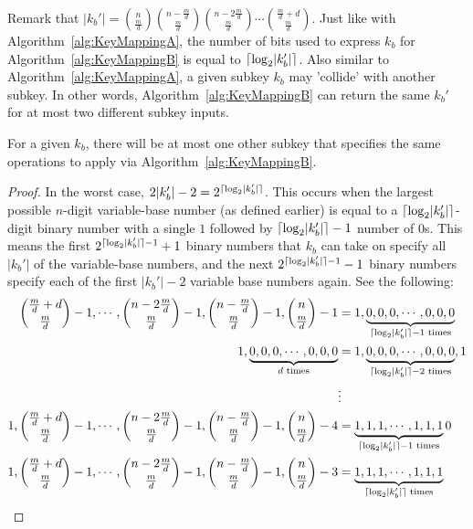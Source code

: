 Remark that $\lvert k_b' \rvert = {n \choose \frac{m}{d}}{n - \frac{m}{d} \choose \frac{m}{d}}{n - 2\frac{m}{d} \choose \frac{m}{d}}\cdots{\frac{m}{d} + d \choose \frac{m}{d}}$. Just like with Algorithm~\ref{alg:KeyMappingA}, the number of bits used to express $k_b$ for Algorithm~\ref{alg:KeyMappingB} is equal to $\lceil\log_2 \lvert k_b' \rvert\rceil$. Also similar to Algorithm~\ref{alg:KeyMappingA}, a given subkey $k_b$ may 'collide' with another subkey. In other words, Algorithm~\ref{alg:KeyMappingB} can return the same $k_b'$ for at most two different subkey inputs.
\begin{theorem}
\label{theorem:collisionForMappingB}
For a given $k_b$, there will be at most one other subkey that specifies the same operations to apply via Algorithm~\ref{alg:KeyMappingB}.
\end{theorem}
\begin{proof}
In the worst case, $2\lvert k_b' \rvert - 2 = 2^{\lceil\log_2 \lvert k_b' \rvert\rceil}$. This occurs when the largest possible $n$-digit variable-base number (as defined earlier) is equal to a $\lceil\log_2 \lvert k_b' \rvert\rceil$-digit binary number with a single $1$ followed by $\lceil\log_2 \lvert k_b' \rvert\rceil - 1$ number of $0$s. This means the first $2^{\lceil\log_2 \lvert k_b' \rvert\rceil - 1} + 1$ binary numbers that $k_b$ can take on specify all $\lvert k_b' \rvert$ of the variable-base numbers, and the next $2^{\lceil\log_2 \lvert k_b' \rvert\rceil - 1} - 1$ binary numbers specify each of the first $\lvert k_b' \rvert - 2$ variable base numbers again. See the following:
\begin{align}
{\frac{m}{d} + d \choose \frac{m}{d}} - 1, \cdots ,{n - 2\frac{m}{d} \choose \frac{m}{d}} - 1, {n - \frac{m}{d} \choose \frac{m}{d}} - 1, {n \choose \frac{m}{d}} - 1 &= 1, \underbrace{0, 0, 0, \cdots ,0,0,0}_{\lceil\log_2 \lvert k_b' \rvert\rceil - 1 \text{ times}}\\
1,\underbrace{0, 0, 0, \cdots ,0,0,0}_{d \text{ times}} &= 1, \underbrace{0, 0, 0, \cdots ,0,0,0}_{\lceil\log_2 \lvert k_b' \rvert\rceil - 2 \text{ times}}, 1\\
& \vdots \nonumber \\
1,{\frac{m}{d} + d \choose \frac{m}{d}} - 1, \cdots ,{n - 2\frac{m}{d} \choose \frac{m}{d}} - 1, {n - \frac{m}{d} \choose \frac{m}{d}} - 1, {n \choose \frac{m}{d}} - 4 &= \underbrace{1, 1, 1, \cdots ,1,1,1}_{\lceil\log_2 \lvert k_b' \rvert\rceil -1\text{ times}} 0 \\
1,{\frac{m}{d} + d \choose \frac{m}{d}} - 1, \cdots ,{n - 2\frac{m}{d} \choose \frac{m}{d}} - 1, {n - \frac{m}{d} \choose \frac{m}{d}} - 1, {n \choose \frac{m}{d}} - 3 &= \underbrace{1, 1, 1, \cdots ,1,1,1}_{\lceil\log_2 \lvert k_b' \rvert\rceil\text{ times}}
\end{align}
\end{proof}

